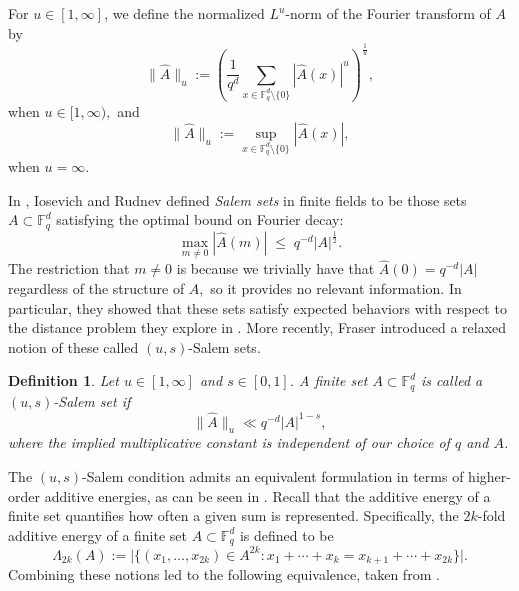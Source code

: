 \documentclass{article}
\newtheorem{definition}[theorem]{Definition}
\begin{document}
For $u\in[1,\infty]$, we define the normalized $L^u$-norm of the Fourier transform of $A$ by
\[
\|\widehat{A}\|_u :=\left(\frac{1}{q^d}\sum\limits_{x\in\mathbb{F}_q^d\setminus\{0\}}
|\widehat{A}(x)|^u\right)^{\frac{1}{u}},
\]
when $u\in[1,\infty),$ and
\[
\|\widehat{A}\|_u :=\sup\limits_{x\in\mathbb{F}_q^d\setminus\{0\}}
|\widehat{A}(x)|,
\]
when $u=\infty.$

In \cite{iosevich-Rudnev-07}, Iosevich and Rudnev defined \emph{Salem sets} in finite fields to be those sets $A\subset \mathbb F_q^d$ satisfying the optimal bound on Fourier decay:
\[
\max_{m\neq 0}|\widehat{A}(m)|
\;\le\; q^{-d}|A|^{\frac{1}{2}}.
\]
The restriction that $m\neq 0$ is because we trivially have that $\widehat{A}(0) = q^{-d}|A|$ regardless of the structure of $A,$ so it provides no relevant information. In particular, they showed that these sets satisfy expected behaviors with respect to the distance problem they explore in \cite{iosevich-Rudnev-07}. More recently, Fraser \cite{fraser2} introduced a relaxed notion of these called $(u,s)$-Salem sets.


\begin{definition}\label{def:us-salem}
Let $u\in[1,\infty]$ and $s\in[0,1]$. A finite set $A\subset\mathbb{F}_q^d$
is called a \emph{$(u,s)$-Salem set} if
\begin{equation}\label{Salem-set-inequality}
\|\widehat{A}\|_u \ll q^{-d}|A|^{1-s},
\end{equation}
where the implied multiplicative constant is independent of our choice of $q$ and $A$.
\end{definition}

The $(u,s)$-Salem condition admits an equivalent formulation in terms of higher-order additive energies, as can be seen in \cite{CGKPTZ25}.
Recall that the additive energy of a finite set quantifies how often a given sum is represented. Specifically, the $2k$-fold additive energy of a finite set
$A\subset\mathbb{F}_q^d$ is defined to be
\[
\Lambda_{2k}(A)
:= \bigl|\{(x_1,\dots,x_{2k})\in A^{2k}:
x_1+\cdots+x_k = x_{k+1}+\cdots+x_{2k}\}\bigr|.
\]
Combining these notions led to the following equivalence, taken from \cite{CGKPTZ25}.

\end{document}
